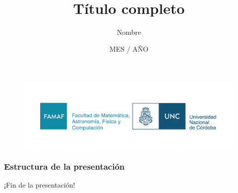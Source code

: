 \documentclass[
    11pt,               %
]{beamer}
\title[Título]{Título completo}          %
\author[Nombre abreviado]{Nombre}        %
\institute[FAMAF]{Facultad de Matemática, Astronomía, Física y Computación \\ (FAMAF - UNC) }
\date[Año]{MES / AÑO}
\begin{document}
\begin{frame}
    \begin{figure}
        \includegraphics[width=0.70\linewidth]{img/famaf.png}
    \end{figure}
    \titlepage
\end{frame}

\begin{frame}
    \frametitle{Estructura de la presentación}
    \tableofcontents
\end{frame}






\begin{frame}
    \begin{center}
        {\Huge ¡Fin de la presentación!}
    \end{center}
\end{frame}
\end{document}
